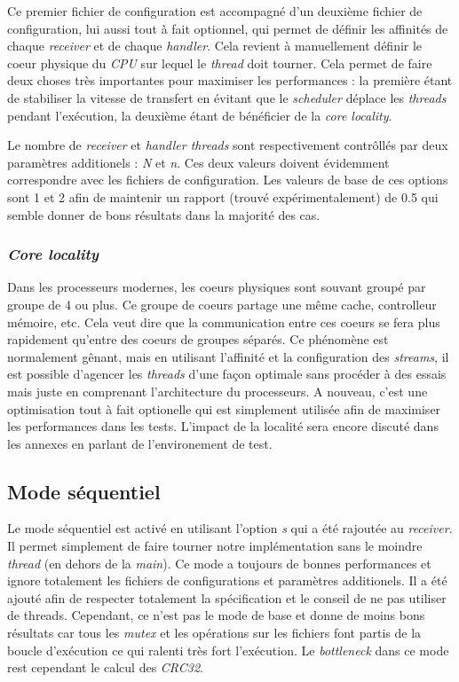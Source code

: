 \documentclass[../main.tex]{subfiles}
\begin{document}
Ce premier fichier de configuration est accompagné d'un deuxième fichier de configuration, lui aussi tout à fait optionnel, qui permet de définir les affinités
de chaque \textit{receiver} et de chaque \textit{handler}. Cela revient à manuellement définir le coeur physique du \textit{CPU} sur lequel le \textit{thread}
doit tourner. Cela permet de faire deux choses très importantes pour maximiser les performances : la première étant de stabiliser la vitesse de transfert 
en évitant que le \textit{scheduler} déplace les \textit{threads} pendant l'exécution, la deuxième étant de bénéficier de la \textit{core locality}. 

Le nombre de \textit{receiver} et \textit{handler threads} sont respectivement contrôllés par deux paramètres additionels : \textit{N} et \textit{n}. Ces deux
valeurs doivent évidemment correspondre avec les fichiers de configuration. Les valeurs de base de ces options sont 1 et 2 afin de maintenir un rapport 
(trouvé expérimentalement) de 0.5 qui semble donner de bons résultats dans la majorité des cas.


\subsubsection{\textit{Core locality}}

Dans les processeurs modernes, les coeurs physiques sont souvant groupé par groupe de 4 ou plus. Ce groupe de coeurs partage une même cache, controlleur mémoire, etc.
Cela veut dire que la communication entre ces coeurs se fera plus rapidement qu'entre des coeurs de groupes séparés. Ce phénomène est normalement gênant, mais
en utilisant l'affinité et la configuration des \textit{streams}, il est possible d'agencer les \textit{threads} d'une façon optimale sans procéder à des essais
mais juste en comprenant l'architecture du processeurs. A nouveau, c'est une optimisation tout à fait optionelle qui est simplement utilisée afin de maximiser
les performances dans les tests. L'impact de la localité sera encore discuté dans les annexes en parlant de l'environement de test.

\subsection{Mode séquentiel}
\label{sec:sequential}

Le mode séquentiel est activé en utilisant l'option \textit{s} qui a été rajoutée au \textit{receiver}. Il permet simplement de faire 
tourner notre implémentation sans le moindre \textit{thread} (en dehors de la \textit{main}). Ce mode a toujours de bonnes performances et ignore totalement 
les fichiers de configurations et paramètres additionels. Il a été ajouté afin de respecter totalement la spécification et le conseil de ne pas utiliser de 
threads. Cependant, ce n'est pas le mode de base et donne de moins bons résultats car tous les \textit{mutex} et les opérations sur les fichiers font partis
de la boucle d'exécution ce qui ralenti très fort l'exécution. Le \textit{bottleneck} dans ce mode rest cependant le calcul des \textit{CRC32}.
\end{document}
